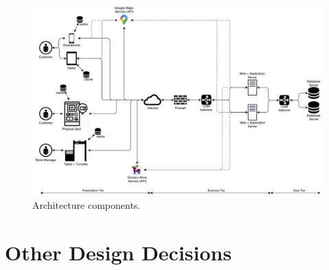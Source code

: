 \begin{figure}[H]
	\centering
	\includegraphics[width=1.0\textwidth]{images/architecture_components.pdf}
	\caption{Architecture components.}
\end{figure}

\section{Other Design Decisions}